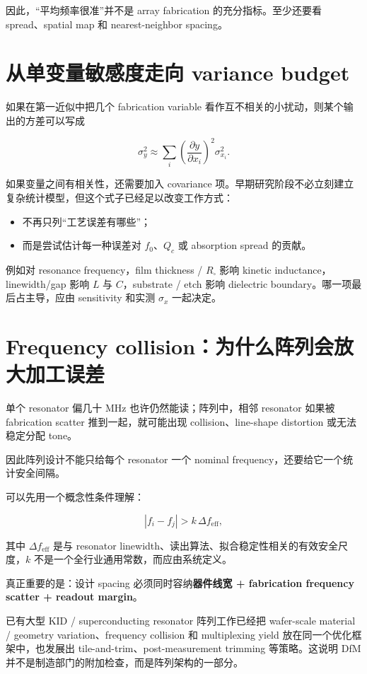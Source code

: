 因此，“平均频率很准”并不是 array fabrication 的充分指标。至少还要看 spread、spatial map 和 nearest-neighbor spacing。

\section{从单变量敏感度走向 variance budget}

如果在第一近似中把几个 fabrication variable 看作互不相关的小扰动，则某个输出的方差可以写成

\[
\sigma_y^2\approx
\sum_i
\left(\frac{\partial y}{\partial x_i}\right)^2
\sigma_{x_i}^2.
\]

如果变量之间有相关性，还需要加入 covariance 项。早期研究阶段不必立刻建立复杂统计模型，但这个式子已经足以改变工作方式：

\begin{itemize}
  \item 不再只列“工艺误差有哪些”；
  \item 而是尝试估计每一种误差对 $f_0$、$Q_c$ 或 absorption spread 的贡献。
\end{itemize}

例如对 resonance frequency，film thickness / $R_\square$ 影响 kinetic inductance，linewidth/gap 影响 $L$ 与 $C$，substrate / etch 影响 dielectric boundary。哪一项最后占主导，应由 sensitivity 和实测 $\sigma_x$ 一起决定。

\section{Frequency collision：为什么阵列会放大加工误差}

单个 resonator 偏几十 MHz 也许仍然能读；阵列中，相邻 resonator 如果被 fabrication scatter 推到一起，就可能出现 collision、line-shape distortion 或无法稳定分配 tone。

因此阵列设计不能只给每个 resonator 一个 nominal frequency，还要给它一个统计安全间隔。

可以先用一个概念性条件理解：

\[
|f_i-f_j| > k\,\Delta f_{\mathrm{eff}},
\]

其中 $\Delta f_{\mathrm{eff}}$ 是与 resonator linewidth、读出算法、拟合稳定性相关的有效安全尺度，$k$ 不是一个全行业通用常数，而应由系统定义。

真正重要的是：设计 spacing 必须同时容纳\textbf{器件线宽 + fabrication frequency scatter + readout margin}。

已有大型 KID / superconducting resonator 阵列工作已经把 wafer-scale material / geometry variation、frequency collision 和 multiplexing yield 放在同一个优化框架中，也发展出 tile-and-trim、post-measurement trimming 等策略。这说明 DfM 并不是制造部门的附加检查，而是阵列架构的一部分。

